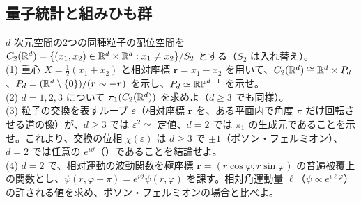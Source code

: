 \subsection{量子統計と組みひも群}

\begin{problem}[難易度 C]\label{ch02-prob-stat}
$d$ 次元空間の2つの同種粒子の配位空間を $C_2(\mathbb{R}^d)=\{(x_1,x_2)\in\mathbb{R}^d\times\mathbb{R}^d:x_1\ne x_2\}/S_2$ とする（$S_2$ は入れ替え）。\\
(1) 重心 $X=\tfrac12(x_1+x_2)$ と相対座標 $\bm r=x_1-x_2$ を用いて、$C_2(\mathbb{R}^d)\cong\mathbb{R}^d\times P_d$、$P_d=(\mathbb{R}^d\setminus\{0\})/(\bm r\sim-\bm r)$ を示し、$P_d\simeq\mathbb{RP}^{d-1}$ を示せ。\\
(2) $d=1,2,3$ について $\pi_1(C_2(\mathbb{R}^d))$ を求めよ（$d\ge3$ でも同様）。\\
(3) 粒子の交換を表すループ $\varepsilon$（相対座標 $\bm r$ を、ある平面内で角度 $\pi$ だけ回転させる道の像）が、$d\ge3$ では $\varepsilon^2\simeq$ 定値、$d=2$ では $\pi_1$ の生成元であることを示せ。これより、交換の位相 $\chi(\varepsilon)$ は $d\ge3$ で $\pm1$（ボソン・フェルミオン）、$d=2$ では任意の $e^{i\vartheta}$（）であることを結論せよ。\\
(4) $d=2$ で、相対運動の波動関数を極座標 $\bm r=(r\cos\varphi,r\sin\varphi)$ の普遍被覆上の関数とし、$\psi(r,\varphi+\pi)=e^{i\vartheta}\psi(r,\varphi)$ を課す。相対角運動量 $\ell$（$\psi\propto e^{i\ell\varphi}$）の許される値を求め、ボソン・フェルミオンの場合と比べよ。
\end{problem}

